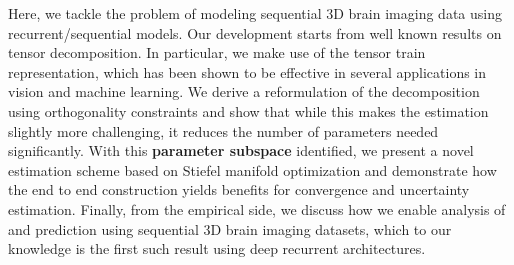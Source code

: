 Here,
we tackle the problem of modeling 
sequential 3D brain imaging data using 
recurrent/sequential models. 
Our development starts from well known results on tensor decomposition. In particular, we 
make use of the tensor train representation, which has been shown to be effective in several 
applications in vision and machine learning. We derive a reformulation of the decomposition using 
orthogonality constraints and show that while this makes the estimation slightly more challenging, 
it reduces the number of parameters needed significantly. 
With this \textbf{parameter subspace} identified,
 we present a novel estimation scheme based on Stiefel manifold optimization and demonstrate 
how the end to end construction yields benefits for convergence and uncertainty estimation. 
Finally, from the empirical side, we discuss how we enable analysis of and prediction using sequential 3D brain imaging datasets, which to our knowledge is the first such result using 
deep recurrent architectures. 
